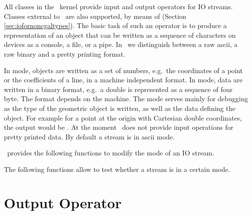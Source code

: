 
All classes in the \cgal\ kernel provide input and output operators for
IO streams.  Classes external to \cgal\ are also supported, by means of  (Section \ref{sec:iofornoncgaltypes}).
The basic task of such an operator is to produce a
representation of an object that can be written as a sequence of
characters on devices as a console, a file, or a pipe. In \cgal\
we distinguish between  a raw ascii, a raw binary and a
pretty printing format.



In  mode, objects are written as
a set of  numbers, e.g.\ the coordinates of a point or
the coefficients of a line, in a machine independent format.
In  mode,
data are written in a binary format, e.g.\ a double is represented
as a sequence of four byte. The format depends on the machine.
The mode  
serves mainly for debugging as the type of the geometric
object is written, as well as the data defining the object. For example
for a point at the origin with Cartesian double coordinates, the output
would be \ccc{PointC2(0.0, 0.0)}.  At the moment \cgal\ does not
provide input operations for pretty printed data. By default a stream
is in {\sc ascii} mode.


\cgal\ provides the following functions to modify the mode of an IO stream.


\ccGlue
{}
\ccGlue
{}

The following functions allow to test whether a stream is in a certain mode.


\ccGlue
{}
\ccGlue
{}




\section{Output Operator}

